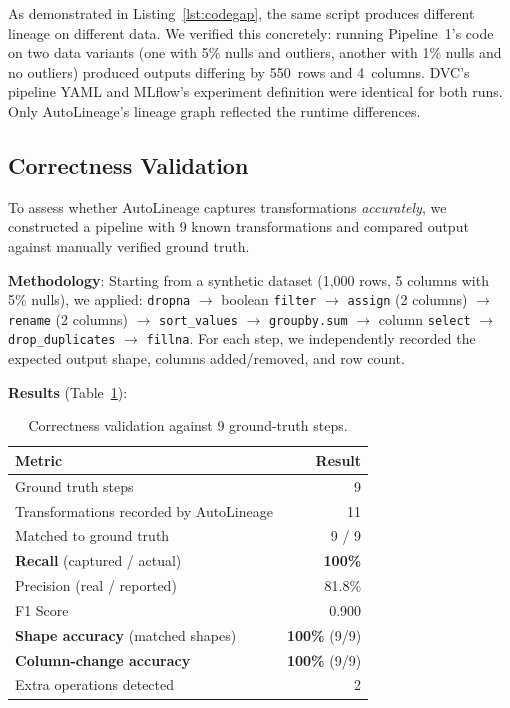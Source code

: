 \documentclass[10pt,twocolumn]{article}
\begin{document}
As demonstrated in Listing~\ref{lst:codegap}, the same script produces different lineage on different data. We verified this concretely: running Pipeline~1's code on two data variants (one with 5\% nulls and outliers, another with 1\% nulls and no outliers) produced outputs differing by 550~rows and 4~columns. DVC's pipeline YAML and MLflow's experiment definition were identical for both runs. Only AutoLineage's lineage graph reflected the runtime differences.

\subsection{Correctness Validation}
\label{sec:correctness}

To assess whether AutoLineage captures transformations \emph{accurately}, we constructed a pipeline with 9 known transformations and compared output against manually verified ground truth.

\textbf{Methodology}: Starting from a synthetic dataset (1,000 rows, 5 columns with 5\% nulls), we applied: \texttt{dropna} $\to$ boolean \texttt{filter} $\to$ \texttt{assign} (2 columns) $\to$ \texttt{rename} (2 columns) $\to$ \texttt{sort\_values} $\to$ \texttt{groupby.sum} $\to$ column \texttt{select} $\to$ \texttt{drop\_duplicates} $\to$ \texttt{fillna}. For each step, we independently recorded the expected output shape, columns added/removed, and row count.

\textbf{Results} (Table~\ref{tab:correctness}):

\begin{table}[t]
\centering
\caption{Correctness validation against 9 ground-truth steps.}
\label{tab:correctness}
\small
\begin{tabular}{@{}lr@{}}
\toprule
\textbf{Metric} & \textbf{Result} \\
\midrule
Ground truth steps & 9 \\
Transformations recorded by AutoLineage & 11 \\
Matched to ground truth & 9 / 9 \\
\midrule
\textbf{Recall} (captured / actual) & \textbf{100\%} \\
Precision (real / reported) & 81.8\% \\
F1 Score & 0.900 \\
\textbf{Shape accuracy} (matched shapes) & \textbf{100\%} (9/9) \\
\textbf{Column-change accuracy} & \textbf{100\%} (9/9) \\
Extra operations detected & 2 \\
\bottomrule
\end{tabular}
\end{table}
\end{document}
